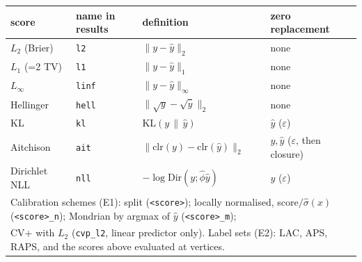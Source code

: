 \begin{tabular}{llll}
\toprule
score & name in results & definition & zero replacement \\ \midrule
$L_2$ (Brier) & \texttt{l2} & $\|y-\hat y\|_2$ & none \\
$L_1$ (=2 TV) & \texttt{l1} & $\|y-\hat y\|_1$ & none \\
$L_\infty$ & \texttt{linf} & $\|y-\hat y\|_\infty$ & none \\
Hellinger & \texttt{hell} & $\|\sqrt y-\sqrt{\hat y}\|_2$ & none \\
KL & \texttt{kl} & $\mathrm{KL}(y\,\|\,\hat y)$ & $\hat y$ ($\varepsilon$) \\
Aitchison & \texttt{ait} & $\|\mathrm{clr}(y)-\mathrm{clr}(\hat y)\|_2$ & $y,\hat y$ ($\varepsilon$, then closure) \\
Dirichlet NLL & \texttt{nll} & $-\log \mathrm{Dir}(y;\hat\phi\hat y)$ & $y$ ($\varepsilon$) \\
\midrule
\multicolumn{4}{l}{Calibration schemes (E1): split (\texttt{<score>}); locally normalised, score$/\hat\sigma(x)$ (\texttt{<score>\_n}); Mondrian by argmax of $\hat y$ (\texttt{<score>\_m});} \\
\multicolumn{4}{l}{CV+ with $L_2$ (\texttt{cvp\_l2}, linear predictor only).  Label sets (E2): LAC, APS, RAPS, and the scores above evaluated at vertices.} \\
\bottomrule
\end{tabular}

